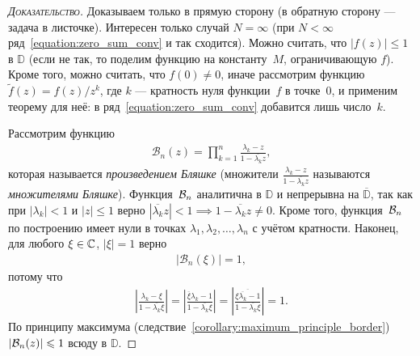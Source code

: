 \documentclass[../complex-analysis.tex]{subfiles}
\begin{document}
\begin{proof}[\normalfont\textsc{Доказательство}]
 Доказываем только в прямую сторону (в обратную сторону --- задача в листочке). Интересен только случай $ N = \infty $ (при $ N < \infty $ ряд~\eqref{equation:zero_sum_conv} и так сходится). Можно считать, что $ \left| f(z) \right| \leqslant 1$ в $ \mathbb D $ (если не так, то поделим функцию на константу~$ M $, ограничивающую $ f $). Кроме того, можно считать, что $ f(0) \neq 0 $, иначе рассмотрим функцию~$ \tilde f(z) = f(z) / z^{k} $, где $ k $ --- кратность нуля функции~$ f $ в точке~$ 0 $, и применим теорему для неё: в ряд~\eqref{equation:zero_sum_conv} добавится лишь число~$ k $.

 Рассмотрим функцию
 \begin{align*}
  \mathcal B_n(z) = \prod_{k=1}^{n} \frac{\lambda_k - z}{1 - \overline{\lambda_k}z},
 \end{align*} которая называется \textit{произведением Бляшке} (множители $ \frac{\lambda_k - z}{1 - \overline{\lambda_k} z} $ называются \emph{множителями Бляшке}). Функция~$ \mathcal{B}_n $ аналитична в $ \mathbb D $ и непрерывна на $ \overline{\mathbb D} $, так как при $ \left| \lambda_k \right| < 1 $ и $ \left| z \right| \leqslant 1 $ верно $ \left| \overline{\lambda_k} z \right| < 1 \implies 1 - \overline{\lambda_k} z \neq 0 $. Кроме того, функция~$ \mathcal{B}_n $ по построению имеет нули в точках $ \lambda_1, \lambda_2, \ldots, \lambda_n $ с учётом кратности. Наконец, для любого $ \xi \in \mathbb{C} $, $ \left| \xi \right|=1 $ верно
 \begin{align*}
  \left| \mathcal B_n(\xi) \right| = 1,
 \end{align*} потому что
 \begin{align*}
  \left| \frac{\lambda_k - \xi}{1 - \overline{\lambda_k}\xi} \right| = \left| \frac{\overline \xi \lambda_k - 1}{1 - \overline{\lambda_k} \xi} \right| = \left| \frac{\overline{\xi \overline{\lambda_k} - 1}}{1 - \overline{\lambda_k} \xi} \right| = 1.
 \end{align*} По принципу максимума (следствие~\ref{corollary:maximum_principle_border}) $ \left| \mathcal{B}_n(z) \right| \leqslant 1$ всюду в $ \mathbb D $.


\end{proof}
\end{document}

